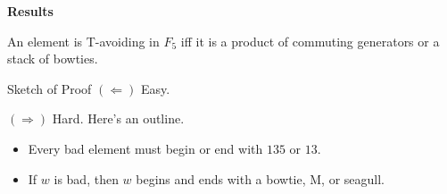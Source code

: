 \documentclass[9pt,handout]{beamer}
\newcommand{\<}{\langle}
\renewcommand{\>}{\rangle}
\begin{document}
\begin{frame}{\textbf{Results}}\pause

\begin{theorem}
An element is T-avoiding in $F_{5}$ iff it is a product of commuting generators or a stack of bowties. 
\end{theorem}

\pause

\begin{block}{Sketch of Proof}
$(\Leftarrow)$ Easy. 

$(\Rightarrow)$ Hard.  Here's an outline. \pause

\begin{itemize}

\item Every bad element must begin or end with $135$ or $13$. \pause

\item If $w$ is bad, then $w$ begins and ends with a bowtie, M, or seagull.

%

\end{itemize}

\end{block}

\end{frame}
\end{document}
